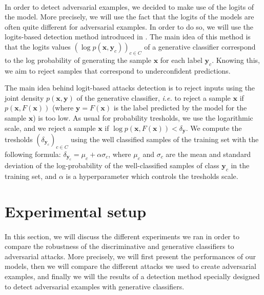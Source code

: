 \documentclass[11pt,twocolumn,letterpaper]{article}
\begin{document}
\paragraph{} In order to detect adversarial examples, we decided to make use of the logits of the model. More precisely, we will use the fact that the logits of the models are often quite different for adversarial examples. In order to do so, we will use the logits-based detection method introduced in \cite{main_paper}. The main idea of this method is that the logits values $(\log{p(\bm{x}, \bm{y}_c)})_{c \in C}$ of a generative classifier correspond to the log probability of generating the sample $\bm{x}$ for each label $\bm{y}_c$. Knowing this, we aim to reject samples that correspond to underconfident predictions. 

The main idea behind logit-based attacks detection is to reject inputs using the joint density $p(\bm{x}, \bm{y})$ of the generative classifier, \textit{i.e.} to reject a sample $\bm{x}$ if $p(\bm{x}, F(\bm{x}))$ (where $\bm{y} = F(\bm{x})$ is the label predicted by the model for the sample $\bm{x}$) is too low. As usual for probability tresholds, we use the logarithmic scale, and we reject a sample $\bm{x}$ if $\log{p(\bm{x}, F(\bm{x}))} < \delta_{\bm{y}}$. We compute the tresholds $(\delta_{\bm{y}_c})_{c \in C}$ using the well classified samples of the training set with the following formula: $\delta_{\bm{y}_c} = \mu_c + \alpha \sigma_c$, where $\mu_c$ and $\sigma_c$ are the mean and standard deviation of the log-probability of the well-classified samples of class $\bm{y}_c$ in the training set, and $\alpha$ is a hyperparameter which controls the tresholds scale.

\section{Experimental setup}
\label{sec:setup}

\paragraph{} In this section, we will discuss the different experiments we ran in order to compare the robustness of the discriminative and generative classifiers to adversarial attacks. More precisely, we will first present the performances of our models, then we will compare the different attacks we used to create adversarial examples, and finally we will the results of a detection method specially designed to detect adversarial examples with generative classifiers.
\end{document}

